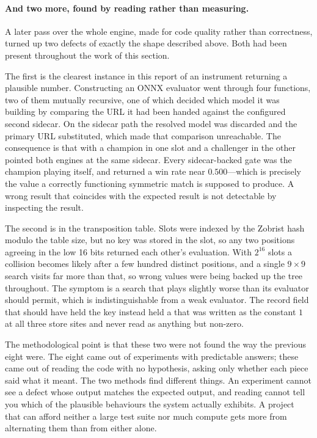 \paragraph{And two more, found by reading rather than measuring.}
\label{sec:pipeline-eval-codereview}
A later pass over the whole engine, made for code quality rather than
correctness, turned up two defects of exactly the shape described above. Both
had been present throughout the work of this section.

The first is the clearest instance in this report of an instrument returning a
plausible number. Constructing an ONNX evaluator went through four functions,
two of them mutually recursive, one of which decided which model it was building
by comparing the URL it had been handed against the configured second sidecar.
On the sidecar path the resolved model was discarded and the primary URL
substituted, which made that comparison unreachable. The consequence is that
 with a champion in one slot and a challenger in the
other pointed both engines at the same sidecar. Every sidecar-backed gate was
the champion playing itself, and returned a win rate near $0.500$---which is
precisely the value a correctly functioning symmetric match is supposed to
produce. A wrong result that coincides with the expected result is not
detectable by inspecting the result.

The second is in the transposition table. Slots were indexed by the Zobrist hash
modulo the table size, but no key was stored in the slot, so any two positions
agreeing in the low 16 bits returned each other's evaluation. With $2^{16}$
slots a collision becomes likely after a few hundred distinct positions, and a
single $9 \times 9$ search visits far more than that, so wrong values were being
backed up the tree throughout. The symptom is a search that plays slightly worse
than its evaluator should permit, which is indistinguishable from a weak
evaluator. The record field that should have held the key instead held a
 that was written as the constant $1$ at all three store sites and
never read as anything but non-zero.

The methodological point is that these two were not found the way the previous
eight were. The eight came out of experiments with predictable answers; these
came out of reading the code with no hypothesis, asking only whether each piece
said what it meant. The two methods find different things. An experiment cannot
see a defect whose output matches the expected output, and reading cannot tell
you which of the plausible behaviours the system actually exhibits. A project
that can afford neither a large test suite nor much compute gets more from
alternating them than from either alone.

